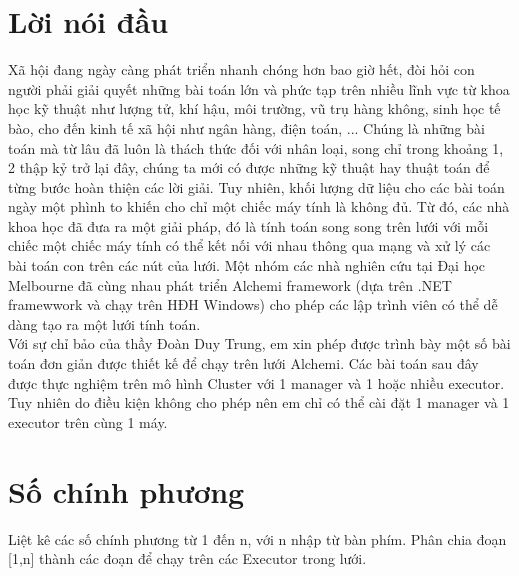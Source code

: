 \documentclass[12pt,a4paper]{report}
\begin{document}
\chapter*{Lời nói đầu}
Xã hội đang ngày càng phát triển nhanh chóng hơn bao giờ hết, đòi hỏi con người phải giải quyết những bài toán lớn và phức tạp trên nhiều lĩnh vực từ khoa học kỹ thuật như lượng tử, khí hậu, môi trường, vũ trụ hàng không, sinh học tế bào, cho đến kinh tế xã hội như ngân hàng, điện toán, ... Chúng là những bài toán mà từ lâu đã luôn là thách thức đối với nhân loại, song chỉ trong khoảng 1, 2 thập kỷ trở lại đây, chúng ta mới có được những kỹ thuật hay thuật toán để từng bước hoàn thiện các lời giải. Tuy nhiên, khối lượng dữ liệu cho các bài toán ngày một phình to khiến cho chỉ một chiếc máy tính là không đủ. Từ đó, các nhà khoa học đã đưa ra một giải pháp, đó là tính toán song song trên lưới với mỗi chiếc một chiếc máy tính có thể kết nối với nhau thông qua mạng và xử lý các bài toán con trên các nút của lưới. Một nhóm các nhà nghiên cứu tại Đại học Melbourne đã cùng nhau phát triển Alchemi framework (dựa trên .NET framewwork và chạy trên HĐH Windows) cho phép các lập trình viên có thể dễ dàng tạo ra một lưới tính toán.	\\

Với sự chỉ bảo của thầy Đoàn Duy Trung, em xin phép được trình bày một số bài toán đơn giản được thiết kế để chạy trên lưới Alchemi. Các bài toán sau đây được thực nghiệm trên mô hình Cluster với 1 manager và 1 hoặc nhiều executor. Tuy nhiên do điều kiện không cho phép nên em chỉ có thể cài đặt 1 manager và 1 executor trên cùng 1 máy.

\tableofcontents	                        %


\chapter{Số chính phương}

\begin{tcolorbox}[title=Đề bài, colback=red!5!white, colframe=red!70!black]
Liệt kê các số chính phương từ 1 đến n, với n nhập từ bàn phím. Phân chia đoạn [1,n] thành các đoạn để chạy trên các Executor trong lưới.
\end{tcolorbox}
\end{document}
